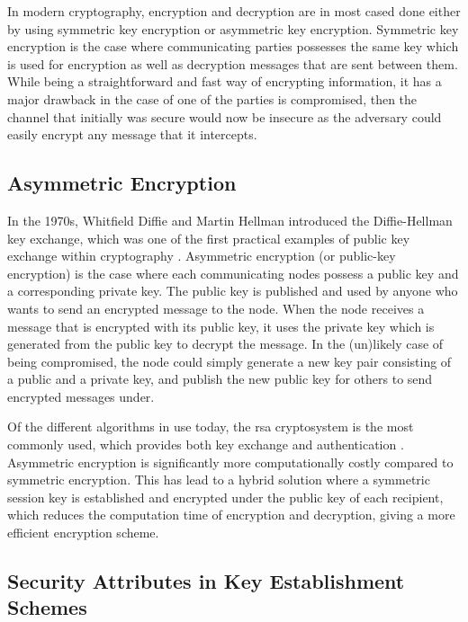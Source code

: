 In modern cryptography, encryption and decryption are in most cased done either by using symmetric key encryption or asymmetric key encryption. Symmetric key encryption is the case where communicating parties possesses the same key which is used for encryption as well as decryption messages that are sent between them. While being a straightforward and fast way of encrypting information, it has a major drawback in the case of one of the parties is compromised, then the channel that initially was secure would now be insecure as the adversary could easily encrypt any message that it intercepts.

\subsection{Asymmetric Encryption}

In the 1970s, Whitfield Diffie and Martin Hellman introduced the Diffie-Hellman key exchange, which was one of the first practical examples of public key exchange within cryptography \cite{diffie1976new}. Asymmetric encryption (or public-key encryption) is the case where each communicating nodes possess a public key and a corresponding private key. The public key is published and used by anyone who wants to send an encrypted message to the node. When the node receives a message that is encrypted with its public key, it uses the private key which is generated from the public key to decrypt the message. In the (un)likely case of being compromised, the node could simply generate a new key pair consisting of a public and a private key, and publish the new public key for others to send encrypted messages under.

Of the different algorithms in use today, the \gls{rsa} cryptosystem is the most commonly used, which provides both key exchange and authentication \cite{wander2005energy}. Asymmetric encryption is significantly more computationally costly compared to symmetric encryption. This has lead to a hybrid solution where a symmetric session key is established and encrypted under the public key of each recipient, which reduces the computation time of encryption and decryption, giving a more efficient encryption scheme.

\subsection{Security Attributes in Key Establishment Schemes}
\label{sec:attributes}

